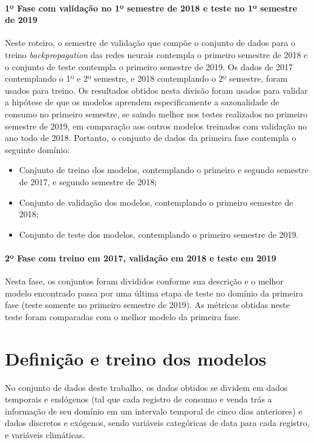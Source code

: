             \paragraph{1º Fase com validação no 1º semestre de 2018 e teste no 1º semestre de 2019}
                Neste roteiro, o semestre de validação que compõe o conjunto de dados para o treino \textit{backpropagation} das redes neurais contempla o primeiro semestre de 2018 e o conjunto de teste contempla o primeiro semestre de 2019.
                Os dados de 2017 contemplando o 1º e 2º semestre, e 2018 contemplando o 2º semestre, foram usados para treino. Os resultados obtidos nesta divisão foram usados para validar a hipótese de que os modelos aprendem especificamente a sazonalidade de consumo no primeiro semestre, se saindo melhor nos testes realizados no primeiro semestre de 2019, em comparação aos outros modelos treinados com validação no ano todo de 2018.
                Portanto, o conjunto de dados da primeira fase contempla o seguinte domínio:
            \begin{itemize}
                    \item Conjunto de treino dos modelos, contemplando o primeiro e segundo semestre de 2017, e segundo semestre de 2018;
                    \item Conjunto de validação dos modelos, contemplando o primeiro semestre de 2018;
                    \item Conjunto de teste dos modelos, contemplando o primeiro semestre de 2019.             
            \end{itemize}
            
            \paragraph{2º Fase com treino em 2017, validação em 2018 e teste em 2019}
                Nesta fase, os conjuntos foram divididos conforme sua descrição e o melhor modelo encontrado passa por uma última etapa de teste no domínio da primeira fase (teste somente no primeiro semestre de 2019).
                As métricas obtidas neste teste foram comparadas com o melhor modelo da primeira fase.
    
    \section{Definição e treino dos modelos}
                No conjunto de dados deste trabalho, os dados obtidos se dividem em dados temporais e endógenos (tal que cada registro de consumo e venda trás a informação de seu domínio em um intervalo temporal de cinco dias anteriores) e dados discretos e exógenos, sendo variáveis categóricas de data para cada registro, e variáveis climáticas.
                
